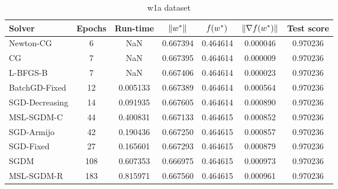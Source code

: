 \begin{table}
\centering
\caption{w1a dataset}
\label{tab:w1a-table}
\begin{tabular}{lS[drop-zero-decimal]S[round-precision=4]S[round-precision=6]S[round-precision=6]S[exponent-mode=scientific]S[round-precision=6]}
\toprule
Solver & {Epochs} & {Run-time} & {$\lVert w^\ast\rVert$} & {$\operatorname*{\mathit{f}}(w^\ast)$} & {$\lVert\nabla f(w^\ast)\rVert$} & {Test score} \\
\midrule
Newton-CG & 6 & NaN & 0.667394 & 0.464614 & 0.000046 & 0.970236 \\
CG & 7 & NaN & 0.667395 & 0.464614 & 0.000009 & 0.970236 \\
L-BFGS-B & 7 & NaN & 0.667406 & 0.464614 & 0.000023 & 0.970236 \\
BatchGD-Fixed & 12 & 0.005133 & 0.667389 & 0.464614 & 0.000564 & 0.970236 \\
SGD-Decreasing & 14 & 0.091935 & 0.667605 & 0.464614 & 0.000890 & 0.970236 \\
MSL-SGDM-C & 44 & 0.400831 & 0.667133 & 0.464615 & 0.000852 & 0.970236 \\
SGD-Armijo & 42 & 0.190436 & 0.667250 & 0.464615 & 0.000857 & 0.970236 \\
SGD-Fixed & 27 & 0.165601 & 0.667293 & 0.464615 & 0.000879 & 0.970236 \\
SGDM & 108 & 0.607353 & 0.666975 & 0.464615 & 0.000973 & 0.970236 \\
MSL-SGDM-R & 183 & 0.815971 & 0.667560 & 0.464615 & 0.000961 & 0.970236 \\
\bottomrule
\end{tabular}
\end{table}

